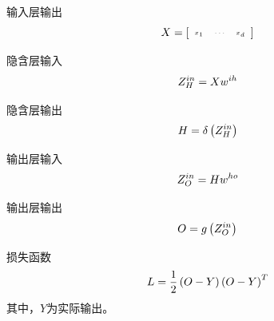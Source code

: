 \documentclass[hyperref,UTF8,11pt]{beamer}
\begin{document}
\begin{frame}
	\begin{block}{\tiny 输入层输出}
        \begin{equation}
\tiny X = \left[ {\begin{array}{*{20}{c}} {{x_1}}& \cdots &{{x_d}} \end{array}} \right]
		\end{equation}
    \end{block}
	
	\begin{block}{\tiny 隐含层输入}
        \begin{equation}
\tiny Z_H^{in} = X{w^{ih}}
		\end{equation}
    \end{block}
	
	\begin{block}{\tiny 隐含层输出}
        \begin{equation}
\tiny H = \delta \left( {Z_H^{in}} \right)
		\end{equation}
    \end{block}
	
	\begin{block}{\tiny 输出层输入}
        \begin{equation}
\tiny Z_O^{in} = H{w^{ho}}
		\end{equation}
    \end{block}
	
	\begin{block}{\tiny 输出层输出}
        \begin{equation}
\tiny O = g\left( {Z_O^{in}} \right)
		\end{equation}
    \end{block}
	
	\begin{block}{\tiny 损失函数}
        \begin{equation}
\tiny L = \frac{1}{2}\left( {O - Y} \right){\left( {O - Y} \right)^T}
		\end{equation}
	\tiny 其中，$Y$为实际输出。
    \end{block}
\end{frame}
\end{document}
